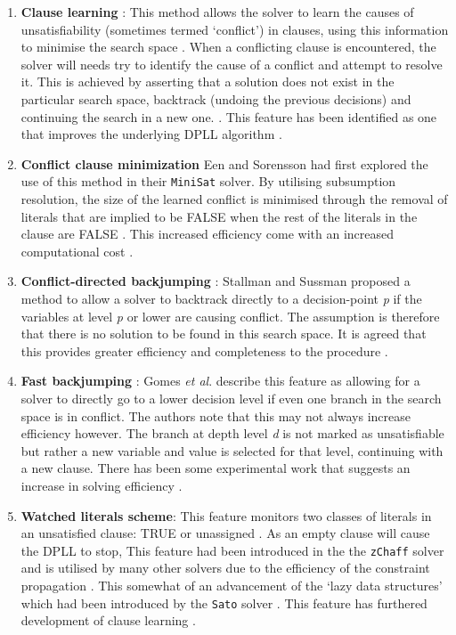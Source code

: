 \documentclass[11pt, a4paper, oneside]{report} %
\begin{document}
\begin{enumerate}
  \item \textbf{Clause learning} :  This method allows the solver to learn the
causes of unsatisfiability (sometimes termed `conflict') in clauses, using this
information to minimise the search space \cite{biere2009conflict}. When a
conflicting clause is encountered, the solver will needs try  to identify the
cause of a conflict and attempt to resolve it. This is achieved by asserting
that a solution does not exist in the particular search space, backtrack
(undoing the previous decisions) and continuing the search in a new one.
\cite{zhang2002quest}. This feature has been identified as one that improves the
underlying DPLL algorithm \cite{zhang2002quest,gomes2008satisfiability}.

  \item \textbf{Conflict clause minimization} Een and Sorensson
\cite{sorensson2005minisat} had first explored the use of this method in their
\texttt{MiniSat} solver. By utilising subsumption resolution, the size of the
learned conflict is minimised through the removal of literals that are implied
to be FALSE when the rest of the literals in the clause are FALSE
\cite{zhang2002quest}. This increased efficiency come with an increased
computational cost \cite{gomes2008satisfiability}.

  \item \textbf{Conflict-directed backjumping} : \indent Stallman and Sussman
\cite{stallman1977forward}   proposed a method to allow a solver to backtrack
directly to a decision-point \textit{p} if the variables at level \textit{p} or
lower are causing conflict. The assumption is therefore that there is no
solution to be found in this search space. It is agreed that this provides
greater efficiency and completeness to the procedure
\cite{gomes2008satisfiability}.


  \item \textbf{Fast backjumping} : Gomes \textit{et al}.
\cite{gomes2008satisfiability} describe this feature as allowing for a solver to
directly go to a lower decision level if even one branch in the search space is
in conflict. The authors note that this may not always increase efficiency
however. The branch at depth level \textit{d} is not marked as unsatisfiable but
rather a new variable and value is selected for that level, continuing with a
new clause. There has been some experimental work that suggests an increase in
solving efficiency \cite{gomes2008satisfiability, kottler2010sat}.

  \item \textbf{Watched literals scheme}:  This feature monitors two classes of
literals in an unsatisfied clause: TRUE or unassigned \cite{moskewicz2001chaff}.
As an empty clause will cause the DPLL to stop, This feature had been introduced
in the the \texttt{zChaff} solver and is utilised by many other solvers due to
the efficiency of the constraint propagation \cite{gomes2008satisfiability}.
This somewhat of an advancement of the `lazy data structures' which had been
introduced by the \texttt{Sato} solver \cite{zhang1997sato}. This feature has
furthered development of clause learning
\cite{zhang2002quest,gomes2008satisfiability}.


\end{enumerate}
\end{document}
